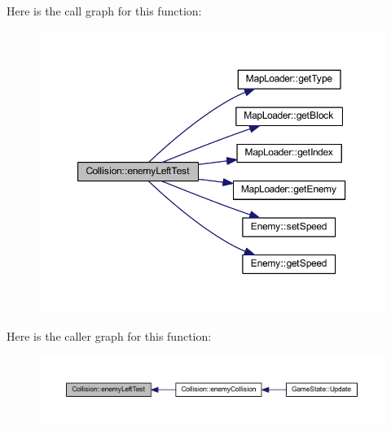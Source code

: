 Here is the call graph for this function\+:
\nopagebreak
\begin{figure}[H]
\begin{center}
\leavevmode
\includegraphics[width=350pt]{class_collision_a359e9c49d721476b11b43e92d7c61723_cgraph}
\end{center}
\end{figure}




Here is the caller graph for this function\+:
\nopagebreak
\begin{figure}[H]
\begin{center}
\leavevmode
\includegraphics[width=350pt]{class_collision_a359e9c49d721476b11b43e92d7c61723_icgraph}
\end{center}
\end{figure}


